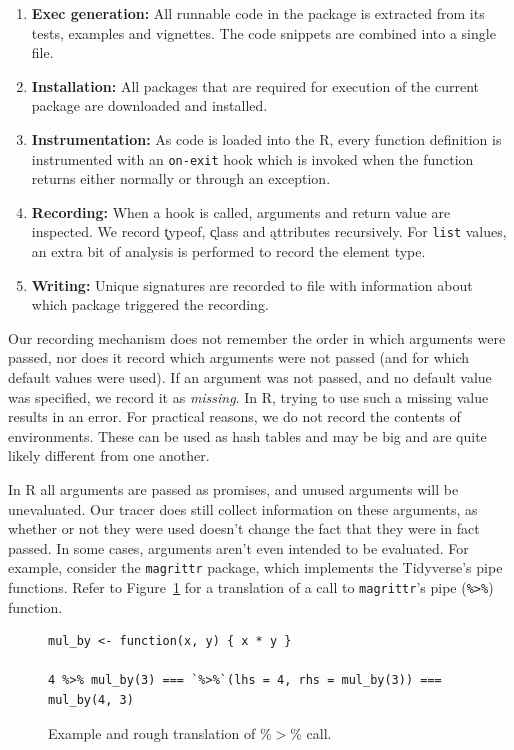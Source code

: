 \documentclass[acmsmall,10pt,review,anonymous]{acmart}\settopmatter{printfolios=true,printccs=false,printacmref=false}
\newcommand{\code}[1]{\lstinline|#1|\xspace}
\begin{document}
\begin{enumerate}
\item {\bf Exec generation:} All runnable code in the package is extracted
  from its tests, examples and vignettes. The code snippets are combined
  into a single file.
\item {\bf Installation:} All packages that are required for execution of
  the current package are downloaded and installed.
\item {\bf Instrumentation:} As code is loaded into the R, every function
  definition is instrumented with an \code{on-exit} hook which is invoked
  when the function returns either normally or through an exception.
\item {\bf Recording:} When a hook is called, arguments and return value are
  inspected. We record \k{typeof}, \k{class} and \k{attributes} recursively.
  For \code{list} values, an extra bit of analysis is performed to record
  the element type.
\item {\bf Writing:} Unique signatures are recorded to file with information
  about which package triggered the recording.
\end{enumerate}

Our recording mechanism does not remember the order in which arguments were
passed, nor does it record which arguments were not passed (and for which
default values were used). If an argument was not passed, and no default
value was specified, we record it as \emph{missing}. In R, trying to use
such a missing value results in an error. For practical reasons, we do not
record the contents of environments. These can be used as hash tables and
may be big and are quite likely different from one another.

In R all arguments are passed as promises, and unused arguments will be
unevaluated.  Our tracer does still collect information on these arguments,
as whether or not they were used doesn't change the fact that they were in
fact passed.  In some cases, arguments aren't even intended to be evaluated.
For example, consider the {\tt magrittr} package, which implements the
Tidyverse's pipe functions.  Refer to Figure~\ref{fig:magpipeex} for a
translation of a call to {\tt magrittr}'s pipe ({\tt \%>\%}) function.

\begin{figure}[!hb]{\small\begin{lstlisting}[style=R]
mul_by <- function(x, y) { x * y }

4 %>% mul_by(3) === `%>%`(lhs = 4, rhs = mul_by(3)) === mul_by(4, 3)
\end{lstlisting}}\caption{Example and rough translation of \%$>$\% call.}\label{fig:magpipeex}\end{figure}
\end{document}
